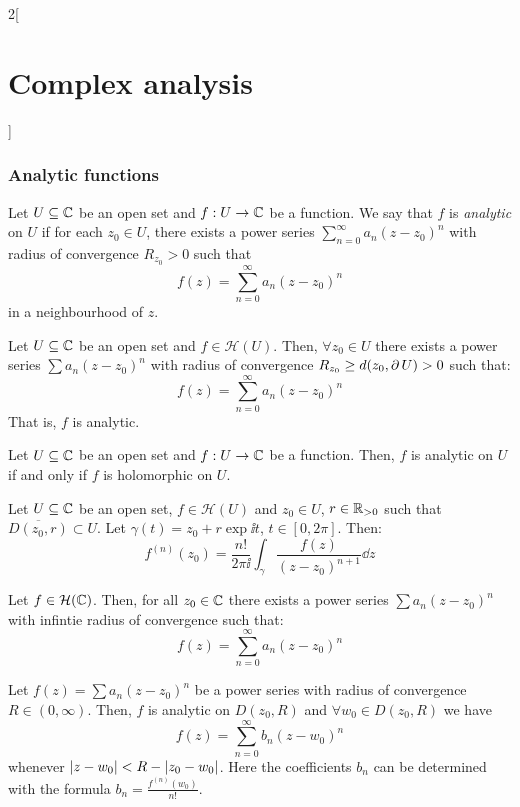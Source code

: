 \documentclass[../../../main.tex]{subfiles}
\begin{document}
\begin{multicols}{2}[\section{Complex analysis}]
  \subsubsection{Analytic functions}
  \begin{definition}
    Let $U\subseteq\mathbb{C}$ be an open set and $f:U\rightarrow \mathbb{C}$ be a function. We say that $f$ is \emph{analytic} on $U$ if for each $z_0\in U$, there exists a power series $\sum_{n=0}^\infty a_n{(z-z_0)}^n$ with radius of convergence $R_{z_0}>0$ such that $$f(z)=\sum_{n=0}^\infty a_n{(z-z_0)}^n$$ in a neighbourhood of $z$.
  \end{definition}
  \begin{theorem}
    Let $U\subseteq\mathbb{C}$ be an open set and $f\in\mathcal{H}(U)$. Then, $\forall z_0\in U$ there exists a power series $\sum a_n{(z-z_0)}^n$ with radius of convergence $R_{z_0}\geq d(z_0,\operatorname{\partial} U)>0$ such that: $$f(z)=\sum_{n=0}^\infty a_n{(z-z_0)}^n$$ That is, $f$ is analytic.
  \end{theorem}
  \begin{corollary}
    Let $U\subseteq\mathbb{C}$ be an open set and $f:U\rightarrow \mathbb{C}$ be a function. Then, $f$ is analytic on $U$ if and only if $f$ is holomorphic on $U$.
  \end{corollary}
  \begin{corollary}
    Let $U\subseteq\mathbb{C}$ be an open set, $f\in\mathcal{H}(U)$ and $z_0\in U$, $r\in\mathbb{R}_{>0}$ such that $\overline{D(z_0,r)}\subset U$. Let $\gamma(t)=z_0+r\exp{\ii t}$, $t\in[0,2\pi]$. Then:
    $$f^{(n)}(z_0)=\frac{n!}{2\pi\ii}\int_\gamma\frac{f(z)}{{(z-z_0)}^{n+1}}\dd{z}$$
  \end{corollary}
  \begin{corollary}
    Let $f\in\mathcal{H}(\mathbb{C})$. Then, for all $z_0\in\mathbb{C}$ there exists a power series $\sum a_n{(z-z_0)}^n$ with infintie radius of convergence such that: $$f(z)=\sum_{n=0}^\infty a_n{(z-z_0)}^n$$
  \end{corollary}
  \begin{corollary}
    Let $f(z)=\sum a_n{(z-z_0)}^n$ be a power series with radius of convergence $R\in(0,\infty)$. Then, $f$ is analytic on $D(z_0,R)$ and $\forall w_0\in D(z_0,R)$ we have $$f(z)=\sum_{n=0}^\infty b_n{(z-w_0)}^n$$ whenever $\abs{z-w_0}<R-|z_0-w_0|$. Here the coefficients $b_n$ can be determined with the formula $b_n=\frac{f^{(n)}(w_0)}{n!}$.
  \end{corollary}

\end{multicols}
\end{document}
